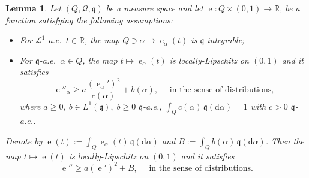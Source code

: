 \documentclass[12pt,a4paper]{amsart}
\theoremstyle{plain}
\newtheorem{lemma}{Lemma}[section]
\theoremstyle{definition}
\numberwithin{equation}{section}
\newcommand{\R}{\mathbb{R}}
\DeclareMathOperator{\ee}{e}
\newcommand{\de}{{\mathrm{d}}}
\newcommand{\qq}{\mathfrak q}
\begin{document}
\begin{lemma}
  \label{eq:family-of-riccati}
  Let $(Q, \mathcal{Q}, \qq)$ be a measure space and let $\ee:Q\times (0,1)\to\R$, be a function satisfying the following assumptions:
  \begin{itemize}
\item For $\mathcal{L}^1$-a.e.\ $t\in \R$, the map $Q\ni \alpha\mapsto \ee_\alpha(t)$ is $\qq$-integrable;
\item For $\qq$-a.e.\ $\alpha\in Q$, the map $t\mapsto \ee_\alpha(t)$ is locally-Lipschitz on $(0,1)$ and it satisfies
 \begin{equation}
    \ee''_\alpha\geq a\frac{(\ee_\alpha')^2}{c(\alpha)}
    +b(\alpha)
    ,
    \quad
    \text{ in the sense of distributions,}
  \end{equation}
  where $a\geq 0$, $b\in L^1(\qq), \; b\geq 0$ $\qq$-a.e., $\int_Q c(\alpha)
  \,\qq(\de\alpha)=1$ with $c>0$ $\qq$-a.e..
\end{itemize}
  Denote by
  $\ee(t):=\int_Q \ee_\alpha(t)\,\qq(\de\alpha)$ and $B:=\int_Q b(\alpha)\,\qq(\de\alpha)$. Then the map $t\mapsto \ee(t)$ is  locally-Lipschitz on $(0,1)$ and it satisfies
  \begin{equation}
    \ee''\geq a(\ee')^2
    +B
    ,
    \quad
    \text{ in the sense of distributions.}
  \end{equation}
\end{lemma}
\end{document}
